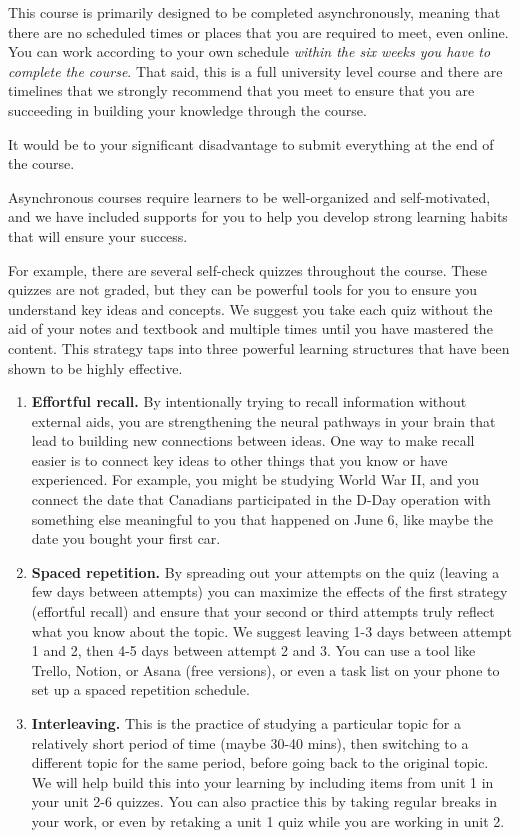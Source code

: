 \documentclass[
]{book}
\providecommand{\tightlist}{%
  \setlength{\itemsep}{0pt}\setlength{\parskip}{0pt}}
\begin{document}
This course is primarily designed to be completed asynchronously, meaning that there are no scheduled times or places that you are required to meet, even online. You can work according to your own schedule \emph{within the six weeks you have to complete the course}. That said, this is a full university level course and there are timelines that we strongly recommend that you meet to ensure that you are succeeding in building your knowledge through the course.

It would be to your significant disadvantage to submit everything at the end of the course.

Asynchronous courses require learners to be well-organized and self-motivated, and we have included supports for you to help you develop strong learning habits that will ensure your success.

For example, there are several self-check quizzes throughout the course. These quizzes are not graded, but they can be powerful tools for you to ensure you understand key ideas and concepts. We suggest you take each quiz without the aid of your notes and textbook and multiple times until you have mastered the content. This strategy taps into three powerful learning structures that have been shown to be highly effective.

\begin{enumerate}
\def\labelenumi{\arabic{enumi}.}
\tightlist
\item
  \textbf{Effortful recall.} By intentionally trying to recall information without external aids, you are strengthening the neural pathways in your brain that lead to building new connections between ideas. One way to make recall easier is to connect key ideas to other things that you know or have experienced. For example, you might be studying World War II, and you connect the date that Canadians participated in the D-Day operation with something else meaningful to you that happened on June 6, like maybe the date you bought your first car.
\item
  \textbf{Spaced repetition.} By spreading out your attempts on the quiz (leaving a few days between attempts) you can maximize the effects of the first strategy (effortful recall) and ensure that your second or third attempts truly reflect what you know about the topic. We suggest leaving 1-3 days between attempt 1 and 2, then 4-5 days between attempt 2 and 3. You can use a tool like Trello, Notion, or Asana (free versions), or even a task list on your phone to set up a spaced repetition schedule.
\item
  \textbf{Interleaving.} This is the practice of studying a particular topic for a relatively short period of time (maybe 30-40 mins), then switching to a different topic for the same period, before going back to the original topic. We will help build this into your learning by including items from unit 1 in your unit 2-6 quizzes. You can also practice this by taking regular breaks in your work, or even by retaking a unit 1 quiz while you are working in unit 2.
\end{enumerate}
\end{document}

